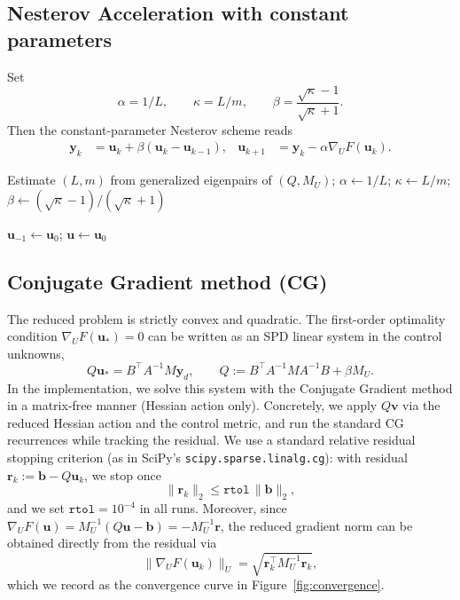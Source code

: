 \documentclass[11pt,a4paper]{article}
\begin{document}
\subsection{Nesterov Acceleration with constant parameters}
Set
\[\alpha = 1/L,\qquad \kappa=L/m,\qquad \beta = \frac{\sqrt{\kappa}-1}{\sqrt{\kappa}+1}.\]
Then the constant-parameter Nesterov scheme reads
\begin{align}
  \mathbf{y}_k &= \mathbf{u}_k + \beta(\mathbf{u}_k - \mathbf{u}_{k-1}), &
  \mathbf{u}_{k+1} &= \mathbf{y}_k - \alpha \nabla_U F(\mathbf{u}_k).
\end{align}

\begin{algorithm}
\caption{Nesterov Acceleration with constant parameters}\label{alg:nest-ml}
Estimate $(L,m)$ from generalized eigenpairs of $(Q, M_U)$; $\alpha \gets 1/L$; $\kappa \gets L/m$; $\beta \gets (\sqrt{\kappa}-1)/(\sqrt{\kappa}+1)$

$\mathbf{u}_{-1} \gets \mathbf{u}_0$; $\mathbf{u} \gets \mathbf{u}_0$\;
\end{algorithm}

\subsection{Conjugate Gradient method (CG)}
The reduced problem is strictly convex and quadratic. The first-order optimality condition $\nabla_U F(\mathbf{u}_*)=0$ can be written as an SPD linear system in the control unknowns,
\begin{equation}
  Q\mathbf{u}_* = B^\top A^{-1} M\mathbf{y}_d, \qquad Q := B^\top A^{-1} M A^{-1} B + \beta M_U.
\end{equation}
In the implementation, we solve this system with the Conjugate Gradient method in a matrix-free manner (Hessian action only). Concretely, we apply $Q\mathbf{v}$ via the reduced Hessian action and the control metric, and run the standard CG recurrences while tracking the residual.
We use a standard relative residual stopping criterion (as in SciPy's \texttt{scipy.sparse.linalg.cg}): with residual $\mathbf{r}_k:=\mathbf{b}-Q\mathbf{u}_k$, we stop once
\[
  \|\mathbf{r}_k\|_2 \le \texttt{rtol}\,\|\mathbf{b}\|_2,
\]
and we set $\texttt{rtol}=10^{-4}$ in all runs.
Moreover, since $\nabla_U F(\mathbf{u})=M_U^{-1}(Q\mathbf{u}-\mathbf{b})=-M_U^{-1}\mathbf{r}$, the reduced gradient norm can be obtained directly from the residual via
\[
  \|\nabla_U F(\mathbf{u}_k)\|_U = \sqrt{\mathbf{r}_k^\top M_U^{-1}\mathbf{r}_k},
\]
which we record as the convergence curve in Figure~\ref{fig:convergence}.
\end{document}
